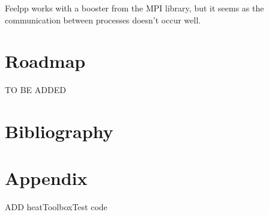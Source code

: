 \documentclass[12pt]{article}
\begin{document}
Feelpp works with a booster from the MPI library, but it seems as the communication between processes doesn't occur well.

\newpage
\section{Roadmap}
TO BE ADDED

\newpage
\section{Bibliography}
\nocite{*}
\printbibliography[heading=none]

\newpage
\section{Appendix}
ADD heatToolboxTest code
\end{document}
